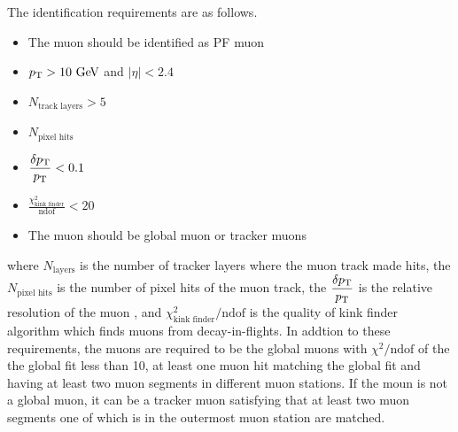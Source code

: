 The identification requirements are as follows. 
\begin{itemize}
\item The muon should be identified as PF muon 
\item $p_\mathrm{T}>10~\mathrm{Ge\kern -0.1em V}$ and $|\eta|<2.4$ 
\item $N_{\textrm{track layers}}>5$ 
\item $N_{\textrm{pixel hits}}$
\item $\displaystyle \frac{\delta p_\mathrm{T}}{p_\mathrm{T}} < 0.1$  
\item $\displaystyle \frac{\chi^2_{\textrm{kink finder}}}{\textrm{ndof}} < 20$
\item The muon should be global muon or tracker muons  
\end{itemize}
where $N_{\textrm{layers}}$ is the number of tracker layers where the muon track made hits, 
the $N_{\textrm{pixel hits}}$ is the number of pixel hits of the muon track,
the $\displaystyle \frac{\delta p_\mathrm{T}}{p_\mathrm{T}}$ is the relative resolution 
of the muon \pt, 
and $\displaystyle \chi^2_{\textrm{kink finder}}/\textrm{ndof}$ is the quality 
of kink finder algorithm which finds muons from decay-in-flights.  
In addtion to these requirements, the muons are required to be the global muons with 
$\chi^2/\textrm{ndof}$ of the the global fit less than 10, 
at least one muon hit matching the global fit 
and having at least two muon segments in different muon stations. 
If the moun is not a global muon, it can be a tracker muon satisfying that at least two muon 
segments one of which is in the outermost muon station are matched.  

